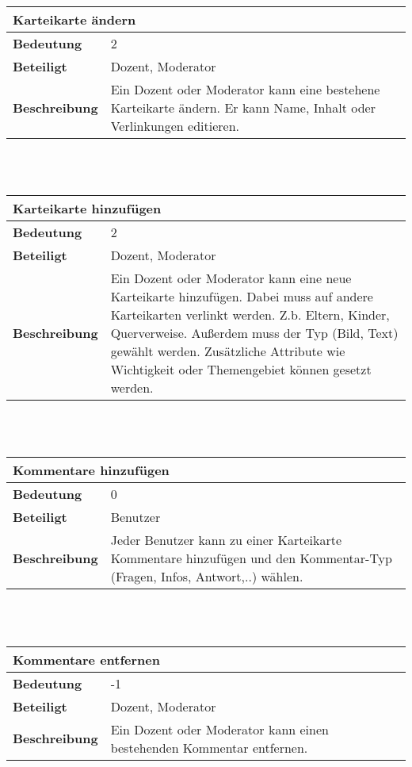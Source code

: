 \documentclass[12pt,a4paper]{article}
\begin{document}
\begin{tabular}{l p{10cm}}
\multicolumn{2}{l}{\textbf{Karteikarte ändern}} \\ \hline
\textbf{Bedeutung} & 2 \\ \hline 
\textbf{Beteiligt} & Dozent, Moderator \\ \hline 
\textbf{Beschreibung} & Ein Dozent oder Moderator kann eine bestehene Karteikarte ändern. Er kann Name, Inhalt oder Verlinkungen editieren.\\ 
\hline 
\end{tabular}\\\\

\begin{tabular}{l p{10cm}}
\multicolumn{2}{l}{\textbf{Karteikarte hinzufügen}} \\ \hline
\textbf{Bedeutung} & 2 \\ \hline 
\textbf{Beteiligt} & Dozent, Moderator \\ \hline 
\textbf{Beschreibung} & Ein Dozent oder Moderator kann eine neue Karteikarte hinzufügen. Dabei muss auf andere Karteikarten verlinkt werden. Z.b. Eltern, Kinder, Querverweise. Außerdem muss der Typ (Bild, Text) gewählt werden. Zusätzliche Attribute wie Wichtigkeit oder Themengebiet können gesetzt werden.\\ 
\hline 
\end{tabular}\\\\

\begin{tabular}{l p{10cm}}
\multicolumn{2}{l}{\textbf{Kommentare hinzufügen}} \\ \hline
\textbf{Bedeutung} & 0 \\ \hline 
\textbf{Beteiligt} & Benutzer \\ \hline 
\textbf{Beschreibung} & Jeder Benutzer kann zu einer Karteikarte Kommentare hinzufügen und den Kommentar-Typ (Fragen, Infos, Antwort,..) wählen.\\ 
\hline 
\end{tabular}\\\\

\begin{tabular}{l p{10cm}}
\multicolumn{2}{l}{\textbf{Kommentare entfernen}} \\ \hline
\textbf{Bedeutung} & -1 \\ \hline 
\textbf{Beteiligt} & Dozent, Moderator \\ \hline 
\textbf{Beschreibung} & Ein Dozent oder Moderator kann einen bestehenden Kommentar entfernen.\\ 
\hline 
\end{tabular}\\\\
\end{document}
